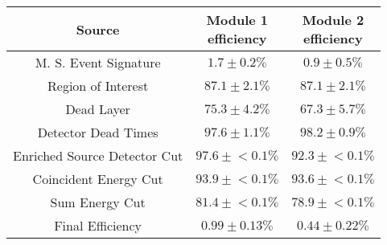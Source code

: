\begin{tabular}{|c|c|c|}
\hline
  Source & \makecell{Module 1\\efficiency} & \makecell{Module 2\\efficiency} \\
\hline
  M. S. Event Signature & $1.7 \pm 0.2\%$ & $0.9 \pm 0.5\%$ \\
  Region of Interest & $87.1 \pm 2.1\%$ & $87.1 \pm 2.1\%$ \\
  Dead Layer & $75.3 \pm 4.2\%$ & $67.3 \pm 5.7\%$ \\
  Detector Dead Times & $97.6 \pm 1.1\%$ & $98.2 \pm 0.9\%$ \\
  Enriched Source Detector Cut & $97.6 \pm{}<\!0.1\%$ & $92.3 \pm{}<\!0.1\%$ \\
  Coincident Energy Cut & $93.9 \pm{}<\!0.1\%$ & $93.6 \pm{}<\!0.1\%$ \\
  Sum Energy Cut & $81.4 \pm{}<\!0.1\%$ & $78.9 \pm{}<\!0.1\%$ \\
  \hline Final Efficiency & $0.99 \pm 0.13\%$ & $0.44 \pm 0.22\%$ \\
\hline
\end{tabular}
